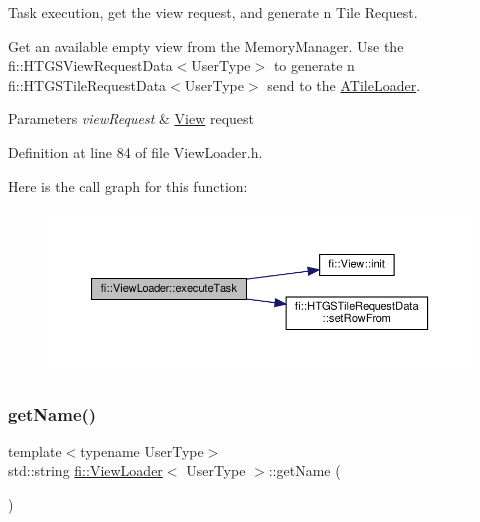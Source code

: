 Task execution, get the view request, and generate n Tile Request. 

Get an available empty view from the Memory\+Manager. Use the fi\+::\+H\+T\+G\+S\+View\+Request\+Data$<$\+User\+Type$>$ to generate n fi\+::\+H\+T\+G\+S\+Tile\+Request\+Data$<$\+User\+Type$>$ send to the \hyperlink{classfi_1_1ATileLoader}{A\+Tile\+Loader}. 
\begin{DoxyParams}{Parameters}
{\em view\+Request} & \hyperlink{classfi_1_1View}{View} request \\
\hline
\end{DoxyParams}


Definition at line 84 of file View\+Loader.\+h.

Here is the call graph for this function\+:
\nopagebreak
\begin{figure}[H]
\begin{center}
\leavevmode
\includegraphics[width=350pt]{d8/daf/classfi_1_1ViewLoader_a15c6540ddf5a8636511be49bb4d2844b_cgraph}
\end{center}
\end{figure}
\mbox{\label{classfi_1_1ViewLoader_aa4fda44b0fd88e5f4ed5b7199c6b44f6}} 
\subsubsection{\texorpdfstring{get\+Name()}{getName()}}
{\footnotesize\ttfamily template$<$typename User\+Type$>$ \\
std\+::string \hyperlink{classfi_1_1ViewLoader}{fi\+::\+View\+Loader}$<$ User\+Type $>$\+::get\+Name (\begin{DoxyParamCaption}{ }\end{DoxyParamCaption})\hspace{0.3cm}{\ttfamily [inline]}}



